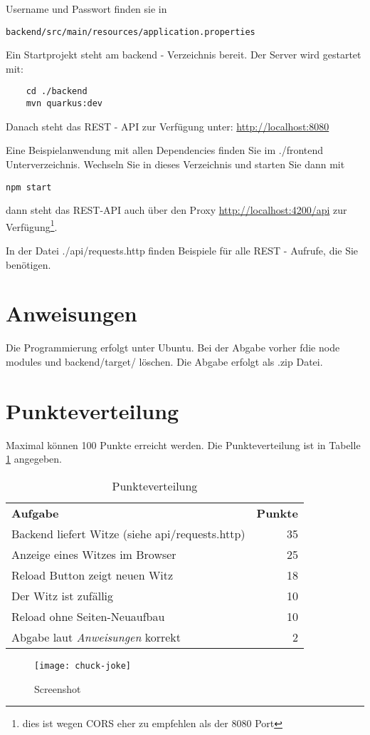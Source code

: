 \documentclass[a4paper, 11pt]{article}
\begin{document}
Username und Passwort finden sie in \begin{verbatim}backend/src/main/resources/application.properties\end{verbatim}

Ein Startprojekt steht am backend - Verzeichnis bereit. 
Der Server wird gestartet mit:
\begin{verbatim}
	cd ./backend
	mvn quarkus:dev
\end{verbatim}
Danach steht das REST - API zur Verfügung unter:
\href{http://localhost:8080}{http://localhost:8080}

Eine Beispielanwendung mit allen Dependencies finden Sie im ./frontend Unterverzeichnis.
Wechseln Sie in dieses Verzeichnis und starten Sie dann mit
\begin{verbatim}
npm start
\end{verbatim}

dann steht das REST-API auch über den Proxy 
\href{http://localhost:4200/api}{http://localhost:4200/api} zur Verfügung\footnote{dies ist wegen CORS eher zu empfehlen als der 8080 Port}.

In der Datei ./api/requests.http finden Beispiele für alle REST - Aufrufe, die Sie benötigen. 
\section{Anweisungen}

Die Programmierung erfolgt unter Ubuntu.
Bei der Abgabe vorher fdie node modules und backend/target/ löschen. Die Abgabe erfolgt als .zip Datei.

\section{Punkteverteilung}
Maximal können 100 Punkte erreicht werden. Die Punkteverteilung ist in Tabelle \ref{tab:points} angegeben.
\begin{table}[ht]
\centering
\caption{Punkteverteilung}

\begin{tabular}{| l | r |} \cline{1-2} 
\textbf{Aufgabe} &  \textbf{Punkte}  \\ \cline{1-2}
Backend liefert Witze (siehe api/requests.http) & 35 \\ \cline{1-2}
Anzeige eines Witzes im Browser & 25 \\ \cline{1-2}
Reload Button zeigt neuen Witz & 18 \\ \cline{1-2}
Der Witz ist zufällig & 10 \\ \cline{1-2}
Reload ohne Seiten-Neuaufbau & 10 \\ \cline{1-2}
Abgabe laut \textit{Anweisungen} korrekt & 2 \\ \cline{1-2}
\end{tabular}
\label{tab:points}
\end{table}

\begin{figure}
	\center
	\texttt{[image: chuck-joke]}
	\caption{Screenshot}
	\label{fig:img}
\end{figure}
\end{document}
